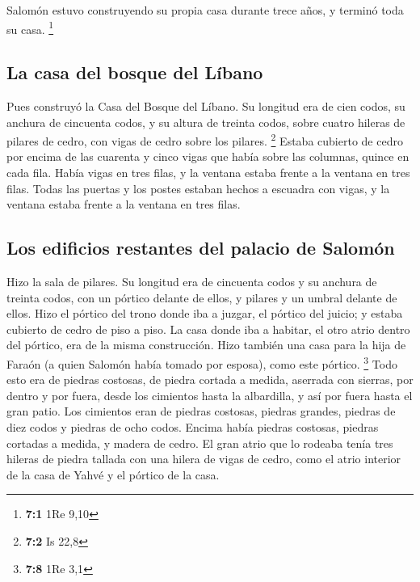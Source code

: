  Salomón estuvo construyendo su propia casa durante trece
años, y terminó toda su casa. \footnote{\textbf{7:1} 1Re 9,10}

\hypertarget{la-casa-del-bosque-del-luxedbano}{%
\subsection{La casa del bosque del
Líbano}\label{la-casa-del-bosque-del-luxedbano}}

 Pues construyó la Casa del Bosque del Líbano. Su longitud
era de cien codos, su anchura de cincuenta codos, y su altura de treinta
codos, sobre cuatro hileras de pilares de cedro, con vigas de cedro
sobre los pilares. \footnote{\textbf{7:2} Is 22,8}  Estaba
cubierto de cedro por encima de las cuarenta y cinco vigas que había
sobre las columnas, quince en cada fila.  Había vigas en
tres filas, y la ventana estaba frente a la ventana en tres filas.
 Todas las puertas y los postes estaban hechos a escuadra
con vigas, y la ventana estaba frente a la ventana en tres filas.

\hypertarget{los-edificios-restantes-del-palacio-de-salomuxf3n}{%
\subsection{Los edificios restantes del palacio de
Salomón}\label{los-edificios-restantes-del-palacio-de-salomuxf3n}}

 Hizo la sala de pilares. Su longitud era de cincuenta
codos y su anchura de treinta codos, con un pórtico delante de ellos, y
pilares y un umbral delante de ellos.  Hizo el pórtico del
trono donde iba a juzgar, el pórtico del juicio; y estaba cubierto de
cedro de piso a piso.  La casa donde iba a habitar, el
otro atrio dentro del pórtico, era de la misma construcción. Hizo
también una casa para la hija de Faraón (a quien Salomón había tomado
por esposa), como este pórtico. \footnote{\textbf{7:8} 1Re 3,1}
 Todo esto era de piedras costosas, de piedra cortada a
medida, aserrada con sierras, por dentro y por fuera, desde los
cimientos hasta la albardilla, y así por fuera hasta el gran patio.
 Los cimientos eran de piedras costosas, piedras grandes,
piedras de diez codos y piedras de ocho codos.  Encima
había piedras costosas, piedras cortadas a medida, y madera de cedro.
 El gran atrio que lo rodeaba tenía tres hileras de
piedra tallada con una hilera de vigas de cedro, como el atrio interior
de la casa de Yahvé y el pórtico de la casa.

